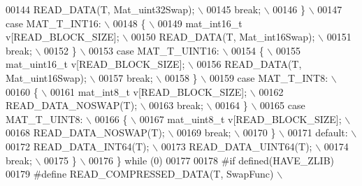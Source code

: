 \begin{DoxyCode}
00144 \textcolor{preprocessor}{                READ\_DATA(T, Mat\_uint32Swap); \(\backslash\)}
00145 \textcolor{preprocessor}{                break; \(\backslash\)}
00146 \textcolor{preprocessor}{            \} \(\backslash\)}
00147 \textcolor{preprocessor}{            case MAT\_T\_INT16: \(\backslash\)}
00148 \textcolor{preprocessor}{            \{ \(\backslash\)}
00149 \textcolor{preprocessor}{                mat\_int16\_t v[READ\_BLOCK\_SIZE]; \(\backslash\)}
00150 \textcolor{preprocessor}{                READ\_DATA(T, Mat\_int16Swap); \(\backslash\)}
00151 \textcolor{preprocessor}{                break; \(\backslash\)}
00152 \textcolor{preprocessor}{            \} \(\backslash\)}
00153 \textcolor{preprocessor}{            case MAT\_T\_UINT16: \(\backslash\)}
00154 \textcolor{preprocessor}{            \{ \(\backslash\)}
00155 \textcolor{preprocessor}{                mat\_uint16\_t v[READ\_BLOCK\_SIZE]; \(\backslash\)}
00156 \textcolor{preprocessor}{                READ\_DATA(T, Mat\_uint16Swap); \(\backslash\)}
00157 \textcolor{preprocessor}{                break; \(\backslash\)}
00158 \textcolor{preprocessor}{            \} \(\backslash\)}
00159 \textcolor{preprocessor}{            case MAT\_T\_INT8: \(\backslash\)}
00160 \textcolor{preprocessor}{            \{ \(\backslash\)}
00161 \textcolor{preprocessor}{                mat\_int8\_t v[READ\_BLOCK\_SIZE]; \(\backslash\)}
00162 \textcolor{preprocessor}{                READ\_DATA\_NOSWAP(T); \(\backslash\)}
00163 \textcolor{preprocessor}{                break; \(\backslash\)}
00164 \textcolor{preprocessor}{            \} \(\backslash\)}
00165 \textcolor{preprocessor}{            case MAT\_T\_UINT8: \(\backslash\)}
00166 \textcolor{preprocessor}{            \{ \(\backslash\)}
00167 \textcolor{preprocessor}{                mat\_uint8\_t v[READ\_BLOCK\_SIZE]; \(\backslash\)}
00168 \textcolor{preprocessor}{                READ\_DATA\_NOSWAP(T); \(\backslash\)}
00169 \textcolor{preprocessor}{                break; \(\backslash\)}
00170 \textcolor{preprocessor}{            \} \(\backslash\)}
00171 \textcolor{preprocessor}{            default: \(\backslash\)}
00172 \textcolor{preprocessor}{                READ\_DATA\_INT64(T); \(\backslash\)}
00173 \textcolor{preprocessor}{                READ\_DATA\_UINT64(T); \(\backslash\)}
00174 \textcolor{preprocessor}{                break; \(\backslash\)}
00175 \textcolor{preprocessor}{        \} \(\backslash\)}
00176 \textcolor{preprocessor}{    \} while (0)}
00177 
00178 \textcolor{preprocessor}{#if defined(HAVE\_ZLIB)}
00179 \textcolor{preprocessor}{#define READ\_COMPRESSED\_DATA(T, SwapFunc) \(\backslash\)}

\end{DoxyCode}
